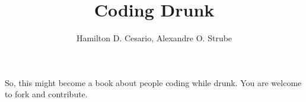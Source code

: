 \documentclass[12pt]{book}
\begin{document}
\title{Coding Drunk}
\author{Hamilton D. Cesario, Alexandre O. Strube}
\date{}
\maketitle

So, this might become a book about people coding while drunk. You are welcome to
fork and contribute.
\end{document}
